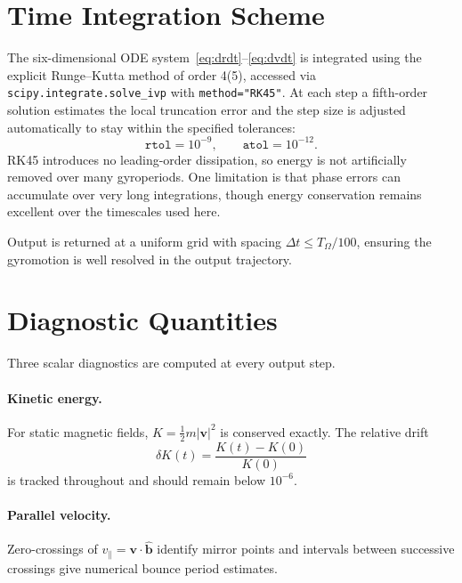 \section{Time Integration Scheme}
\label{sec:integrator}

The six-dimensional ODE system~\eqref{eq:drdt}--\eqref{eq:dvdt} is integrated using the explicit Runge--Kutta method of order 4(5), accessed via \texttt{scipy.integrate.solve\_ivp} with \texttt{method="RK45"}. At each step a fifth-order solution estimates the local truncation error and the step size is adjusted automatically to stay within the specified tolerances:
\begin{equation}
  \texttt{rtol} = 10^{-9}, \qquad \texttt{atol} = 10^{-12}.
  \label{eq:tolerances_num}
\end{equation}
RK45 introduces no leading-order dissipation, so energy is not
artificially removed over many gyroperiods. One limitation is that phase errors can accumulate over very long integrations, though energy conservation remains excellent over the timescales used here.

Output is returned at a uniform grid with spacing
$\Delta t \le T_\Omega / 100$, ensuring the gyromotion is well resolved in the output trajectory.

\section{Diagnostic Quantities}
\label{sec:diagnostics}

Three scalar diagnostics are computed at every output step.

\paragraph{Kinetic energy.} For static magnetic fields,
$K = \tfrac{1}{2}m|\mathbf{v}|^2$ is conserved exactly. The relative
drift
\begin{equation}
  \delta K(t) = \frac{K(t) - K(0)}{K(0)}
  \label{eq:energy_diag}
\end{equation}
is tracked throughout and should remain below $10^{-6}$.

\paragraph{Parallel velocity.} Zero-crossings of
$v_\parallel = \mathbf{v} \cdot \hat{\mathbf{b}}$ identify mirror points and intervals between successive crossings give numerical bounce period estimates.

